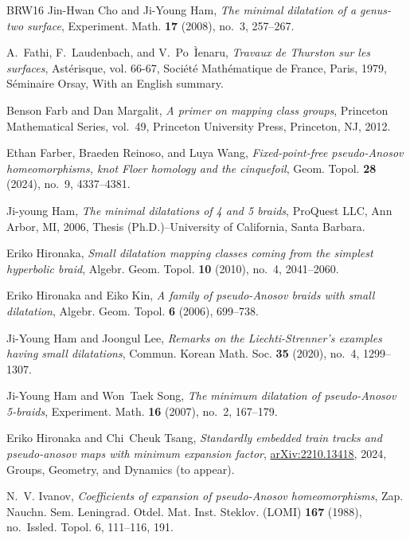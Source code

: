 \documentclass{amsart}
\theoremstyle{definition}
\theoremstyle{remark}
\begin{document}
\begin{thebibliography}{BRW16}
Jin-Hwan Cho and Ji-Young Ham, \emph{The minimal dilatation of a genus-two
  surface}, Experiment. Math. \textbf{17} (2008), no.~3, 257--267. 

A.~Fathi, F.~Laudenbach, and V.~Po~Ìenaru, \emph{Travaux de {T}hurston sur les
  surfaces}, Ast\'erisque, vol. 66-67, Soci\'et\'e{} Math\'ematique de France,
  Paris, 1979, S\'eminaire Orsay, With an English summary. 

Benson Farb and Dan Margalit, \emph{A primer on mapping class groups},
  Princeton Mathematical Series, vol.~49, Princeton University Press,
  Princeton, NJ, 2012. 

Ethan Farber, Braeden Reinoso, and Luya Wang, \emph{Fixed-point-free
  pseudo-{A}nosov homeomorphisms, knot {F}loer homology and the cinquefoil},
  Geom. Topol. \textbf{28} (2024), no.~9, 4337--4381. 

Ji-young Ham, \emph{The minimal dilatations of 4 and 5 braids}, ProQuest LLC,
  Ann Arbor, MI, 2006, Thesis (Ph.D.)--University of California, Santa Barbara.

Eriko Hironaka, \emph{Small dilatation mapping classes coming from the simplest
  hyperbolic braid}, Algebr. Geom. Topol. \textbf{10} (2010), no.~4,
  2041--2060. 

Eriko Hironaka and Eiko Kin, \emph{A family of pseudo-{A}nosov braids with
  small dilatation}, Algebr. Geom. Topol. \textbf{6} (2006), 699--738.

Ji-Young Ham and Joongul Lee, \emph{Remarks on the {L}iechti-{S}trenner's
  examples having small dilatations}, Commun. Korean Math. Soc. \textbf{35}
  (2020), no.~4, 1299--1307. 

Ji-Young Ham and Won~Taek Song, \emph{The minimum dilatation of pseudo-{A}nosov
  5-braids}, Experiment. Math. \textbf{16} (2007), no.~2, 167--179.

Eriko Hironaka and Chi~Cheuk Tsang, \emph{Standardly embedded train tracks and
  pseudo-anosov maps with minimum expansion factor}, \url{arXiv:2210.13418},
  2024, Groups, Geometry, and Dynamics (to appear).

N.~V. Ivanov, \emph{Coefficients of expansion of pseudo-{A}nosov
  homeomorphisms}, Zap. Nauchn. Sem. Leningrad. Otdel. Mat. Inst. Steklov.
  (LOMI) \textbf{167} (1988), no.~Issled. Topol. 6, 111--116, 191. 


\end{thebibliography}
\end{document}
